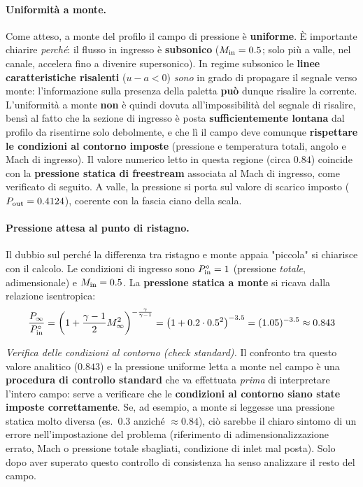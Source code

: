 \paragraph{Uniformità a monte.}
Come atteso, a monte del profilo il campo di pressione è \textbf{uniforme}. È importante
chiarire \emph{perché}: il flusso in ingresso è \textbf{subsonico} ($M_{\rm in} = 0.5$; solo più
a valle, nel canale, accelera fino a divenire supersonico). In regime subsonico le
\textbf{linee caratteristiche risalenti} ($u-a < 0$) \emph{sono} in grado di propagare il
segnale verso monte: l'informazione sulla presenza della paletta \textbf{può} dunque
risalire la corrente. L'uniformità a monte \textbf{non} è quindi dovuta all'impossibilità del
segnale di risalire, bensì al fatto che la sezione di ingresso è posta
\textbf{sufficientemente lontana} dal profilo da risentirne solo debolmente, e che lì il campo
deve comunque \textbf{rispettare le condizioni al contorno imposte} (pressione e temperatura
totali, angolo e Mach di ingresso). Il valore numerico letto in questa regione (circa $0.84$)
coincide con la \textbf{pressione statica di freestream} associata al Mach di ingresso, come
verificato di seguito. A valle, la pressione si porta sul valore di scarico imposto
($P_{\rm out} = 0.4124$), coerente con la fascia ciano della scala.

\paragraph{Pressione attesa al punto di ristagno.}
Il dubbio sul perché la differenza tra ristagno e monte appaia "piccola" si chiarisce con il
calcolo. Le condizioni di ingresso sono $P^\circ_{\rm in} = 1$ (pressione \emph{totale},
adimensionale) e $M_{\rm in} = 0.5$. La \textbf{pressione statica a monte} si ricava dalla
relazione isentropica:
\begin{equation}
  \frac{P_\infty}{P^\circ_{\rm in}}
  = \left(1 + \frac{\gamma-1}{2}M_\infty^2\right)^{-\frac{\gamma}{\gamma-1}}
  = \left(1 + 0.2\cdot 0.5^2\right)^{-3.5}
  = (1.05)^{-3.5} \approx 0.843
  \label{eq:p_statica_monte}
\end{equation}

\noindent\emph{Verifica delle condizioni al contorno (check standard).} Il confronto tra questo
valore analitico ($0.843$) e la pressione uniforme letta a monte nel campo è una
\textbf{procedura di controllo standard} che va effettuata \emph{prima} di interpretare
l'intero campo: serve a verificare che le \textbf{condizioni al contorno siano state imposte
correttamente}. Se, ad esempio, a monte si leggesse una pressione statica molto diversa
(es.\ $0.3$ anziché $\approx 0.84$), ciò sarebbe il chiaro sintomo di un errore nell'impostazione
del problema (riferimento di adimensionalizzazione errato, Mach o pressione totale sbagliati,
condizione di inlet mal posta). Solo dopo aver superato questo controllo di consistenza ha senso
analizzare il resto del campo.

